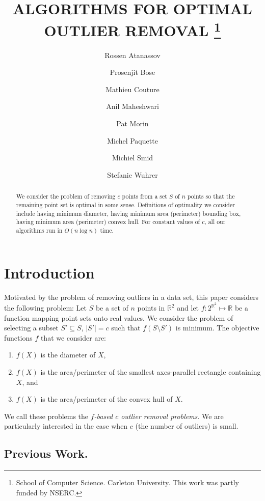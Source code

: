 \documentclass[lotsofwhite]{patmorin}
\title{
\MakeUppercase{Algorithms for Optimal Outlier Removal}%
\thanks{School of Computer Science. Carleton University. This work was partly funded by NSERC.}}
\author{Rossen Atanassov \and
	Prosenjit Bose \and
	Mathieu Couture \and
	Anil Maheshwari \and
	Pat Morin \and
	Michel Paquette \and
	Michiel Smid \and
	Stefanie Wuhrer
}
\date{}
\begin{document}
\maketitle

\begin{abstract}
We consider the problem of removing $c$ points from a set $S$ of $n$
points so that the remaining point set is optimal in some sense.
Definitions of optimality we consider include having minimum diameter,
having minimum area (perimeter) bounding box, having minimum area
(perimeter) convex hull.  For constant values of $c$, all our
algorithms run in $O(n\log n)$ time.
\end{abstract}

\section{Introduction}

Motivated by the problem of removing outliers in a data set, this
paper considers the following problem: Let $S$ be a set of $n$ points
in $\mathbb{R}^2$ and let $f:2^{\mathbb{R}^2}\mapsto \mathbb{R}$ be a
function mapping point sets onto real values.  We consider the problem
of selecting a subset $S'\subseteq S$, $|S'|=c$ such that
$f(S\setminus S')$ is minimum.  The objective functions $f$ that we
consider are:
\begin{enumerate}
\item $f(X)$ is the diameter of $X$,
\item $f(X)$ is the area/perimeter of the smallest axes-parallel
rectangle containing $X$, and
\item $f(X)$ is the area/perimeter of the convex hull of $X$.
\end{enumerate}  

We call these problems the \emph{$f$-based $c$ outlier removal problems}.
We are particularly interested in the case when $c$ (the number of
outliers) is small.

\subsection{Previous Work.} 
\end{document}
